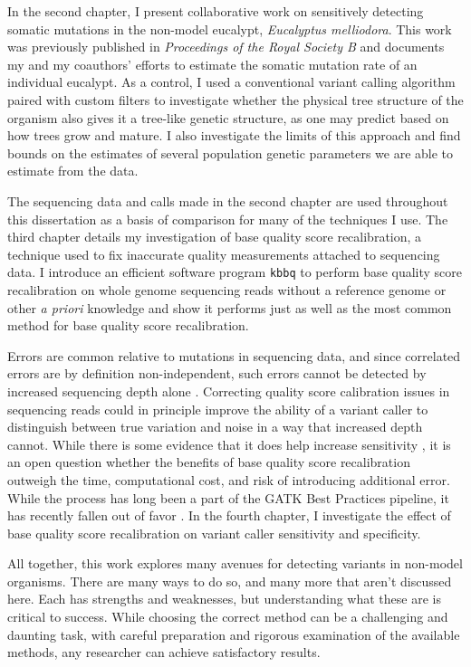 In the second chapter, I present collaborative work on sensitively detecting somatic mutations in the non-model eucalypt, \textit{Eucalyptus melliodora}. This work was previously published in \textit{Proceedings of the Royal Society B} and documents my and my coauthors' efforts to estimate the somatic mutation rate of an individual eucalypt. As a control, I used a conventional variant calling algorithm paired with custom filters to investigate whether the physical tree structure of the organism also gives it a tree-like genetic structure, as one may predict based on how trees grow and mature. I also investigate the limits of this approach and find bounds on the estimates of several population genetic parameters we are able to estimate from the data.

The sequencing data and calls made in the second chapter are used throughout this dissertation as a basis of comparison for many of the techniques I use. The third chapter details my investigation of base quality score recalibration, a technique used to fix inaccurate quality measurements attached to sequencing data. I introduce an efficient software program \texttt{kbbq} to perform base quality score recalibration on whole genome sequencing reads without a reference genome or other \textit{a priori} knowledge and show it performs just as well as the most common method for base quality score recalibration.

Errors are common relative to mutations in sequencing data, \parencite{fox_accuracy_2014, wu_estimating_2017} and since correlated errors are by definition non-independent, such errors cannot be detected by increased sequencing depth alone \parencite{meacham_identification_2011, taub_overcoming_2010}. Correcting quality score calibration issues in sequencing reads could in principle improve the ability of a variant caller to distinguish between true variation and noise in a way that increased depth cannot. While there is some evidence that it does help increase sensitivity \parencite{ni_improvement_2016}, it is an open question whether the benefits of base quality score recalibration outweigh the time, computational cost, and risk of introducing additional error. While the process has long been a part of the GATK Best Practices pipeline, it has recently fallen out of favor \parencite{van_der_auwera_geraldine_2020_b}. In the fourth chapter, I investigate the effect of base quality score recalibration on variant caller sensitivity and specificity.

All together, this work explores many avenues for detecting variants in non-model organisms. 
There are many ways to do so, and many more that aren't discussed here.
Each has strengths and weaknesses, but understanding what these are is critical to success.
While choosing the correct method can be a challenging and daunting task, with careful preparation and rigorous examination of the available methods, any researcher can achieve satisfactory results.

\printbibliography[segment=\therefsegment]{}
